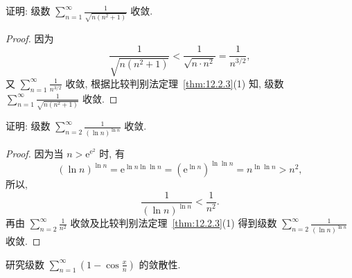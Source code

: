 \begin{example}\label{ex:12.2.5}
证明: 级数 $\sum_{n=1}^{\infty}\frac{1}{\sqrt{n(n^{2}+1)}}$ 收敛.
\end{example}

\begin{proof}
因为
\[
  \frac{1}{\sqrt{n(n^{2}+1)}}<\frac{1}{\sqrt{n\cdot n^{2}}}=\frac{1}{n^{3/2}},
\]
又 $\sum_{n=1}^{\infty}\frac{1}{n^{3/2}}$ 收敛, 根据比较判别法定理~\ref{thm:12.2.3}(1) 知, 级数 $\sum_{n=1}^{\infty}\frac{1}{\sqrt{n(n^{2}+1)}}$ 收敛.
\end{proof}

\begin{example}\label{ex:12.2.6}
证明: 级数 $\sum_{n=2}^{\infty}\frac{1}{(\ln n)^{\ln n}}$ 收敛.
\end{example}

\begin{proof}
因为当 $n>\mathrm{e}^{\mathrm{e}^{2}}$ 时, 有
\[
  (\ln n)^{\ln n}=\mathrm{e}^{\ln n\ln\ln n}
  =\left(\mathrm{e}^{\ln n}\right)^{\ln\ln n}
  =n^{\ln\ln n}>n^{2},
\]
所以,
\[
  \frac{1}{(\ln n)^{\ln n}}<\frac{1}{n^{2}}.
\]
再由 $\sum_{n=2}^{\infty}\frac{1}{n^{2}}$ 收敛及比较判别法定理~\ref{thm:12.2.3}(1) 得到级数 $\sum_{n=2}^{\infty}\frac{1}{(\ln n)^{\ln n}}$ 收敛.
\end{proof}

\begin{example}\label{ex:12.2.7}
研究级数 $\sum_{n=1}^{\infty}\left(1-\cos\frac{x}{n}\right)$ 的敛散性.
\end{example}


